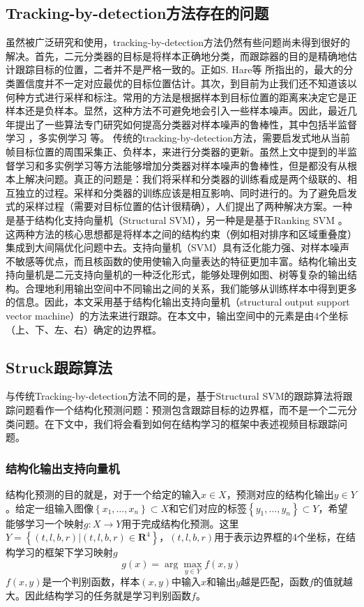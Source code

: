 \subsection{Tracking-by-detection方法存在的问题}
虽然被广泛研究和使用，tracking-by-detection方法仍然有些问题尚未得到很好的解决。首先，二元分类器的目标是将样本正确地分类，而跟踪器的目的是精确地估计跟踪目标的位置，二者并不是严格一致的。正如S. Hare等 \cite{struck}所指出的，最大的分类置信度并不一定对应最优的目标位置估计。其次，到目前为止我们还不知道该以何种方式进行采样和标注。常用的方法是根据样本到目标位置的距离来决定它是正样本还是负样本。显然，这种方法不可避免地会引入一些样本噪声。因此，最近几年提出了一些算法专门研究如何提高分类器对样本噪声的鲁棒性，其中包括半监督学习 \cite{boost-track} \cite{multi-view}，多实例学习 \cite{mil} \cite{mib}等。
传统的tracking-by-detection方法，需要启发式地从当前帧目标位置的周围采集正、负样本，来进行分类器的更新。虽然上文中提到的半监督学习和多实例学习等方法能够增加分类器对样本噪声的鲁棒性，但是都没有从根本上解决问题。真正的问题是：我们将采样和分类器的训练看成是两个级联的、相互独立的过程。采样和分类器的训练应该是相互影响、同时进行的。为了避免启发式的采样过程（需要对目标位置的估计很精确），人们提出了两种解决方案。一种是基于结构化支持向量机（Structural SVM）\cite{struck}，另一种是是基于Ranking SVM \cite{rank-svm}。这两种方法的核心思想都是将样本之间的结构约束（例如相对排序和区域重叠度）集成到大间隔优化问题中去。支持向量机（SVM）具有泛化能力强、对样本噪声不敏感等优点，而且核函数的使用使输入向量表达的特征更加丰富。结构化输出支持向量机是二元支持向量机的一种泛化形式，能够处理例如图、树等复杂的输出结构。合理地利用输出空间中不同输出之间的关系，我们能够从训练样本中得到更多的信息。因此，本文采用基于结构化输出支持向量机（structural output support vector machine）的方法来进行跟踪。在本文中，输出空间中的元素是由4个坐标（上、下、左、右）确定的边界框。

\subsection{Struck跟踪算法}
与传统Tracking-by-detection方法不同的是，基于Structural SVM的跟踪算法将跟踪问题看作一个结构化预测问题：预测包含跟踪目标的边界框，而不是一个二元分类问题。在下文中，我们将会看到如何在结构学习的框架中表述视频目标跟踪问题。

\subsubsection{结构化输出支持向量机}
结构化预测的目的就是，对于一个给定的输入$x \in X$，预测对应的结构化输出$y \in Y$。给定一组输入图像$\left\{x_1,\dots,x_n\right\} \subset X$和它们对应的标签$\left\{y_1,\dots,y_n\right\} \subset Y$，希望能够学习一个映射$g:X \rightarrow Y$用于完成结构化预测。这里$Y=\left\{(t,l,b,r)|(t,l,b,r) \in \textbf{R}^4\right\}$，$(t,l,b,r)$用于表示边界框的4个坐标，在结构学习的框架下学习映射$g$
\begin{equation}
g(x)=\arg \max_{y \in Y}{f(x,y)}
\end{equation}
$f(x,y)$是一个判别函数，样本$(x,y)$中输入$x$和输出$y$越是匹配，函数$f$的值就越大。因此结构学习的任务就是学习判别函数$f$。

